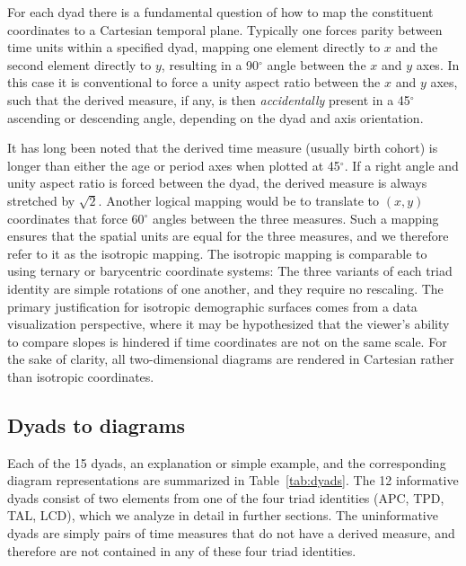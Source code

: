 \documentclass[12pt,oneside,a4paper,doublespacing]{article} %
\theoremstyle{definition}
\begin{document}
For each dyad there is a fundamental question of how to map the constituent
coordinates to a Cartesian temporal plane. Typically one forces parity between time units within
a specified dyad, mapping one element directly to $x$ and the second element
directly to $y$, resulting in a 90$^\circ$ angle between the $x$ and $y$
axes. In this case it is conventional to force a unity aspect ratio
between the $x$ and $y$ axes, such that the derived measure, if any, is then
\textit{accidentally} present in a 45$^\circ$ ascending or descending angle,
depending on the dyad and axis orientation. 

It has long been noted \citep{lexis1875einleitung, perozzo1880della} that the
derived time measure (usually birth cohort) is longer than either the age or period axes when plotted at 45$^\circ$.
If a right angle and unity aspect ratio is forced between the dyad, the derived measure is always stretched by
$\sqrt{2}$. Another
logical mapping would be to translate to $(x,y)$ coordinates that force 60$^\circ$
angles between the three measures. Such a mapping ensures that the spatial units are equal for the three measures, and we therefore refer to it as the isotropic mapping. The isotropic mapping
is comparable to using ternary or barycentric coordinate systems: The three variants of each
 triad identity are simple rotations of one another, and they require no
 rescaling. The primary justification for isotropic demographic surfaces comes from
a data visualization perspective, where it may be hypothesized that the
 viewer's ability to compare slopes is hindered if time coordinates are not on
 the same scale. For the sake of clarity, all two-dimensional diagrams are rendered in
 Cartesian rather than isotropic coordinates.

\subsection{Dyads to diagrams}
Each of the 15 dyads, an explanation or simple example,
and the corresponding diagram representations are summarized in
Table~\ref{tab:dyads}. The 12 informative dyads consist of two
elements from one of the four triad identities (APC, TPD, TAL, LCD), which we
analyze in detail in further sections. The uninformative dyads are simply pairs
of time measures that do not have a derived measure, and therefore are not
contained in any of these four triad identities.
\pagebreak
\end{document}
